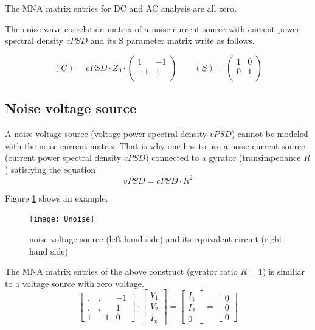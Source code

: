 The MNA matrix entries for DC and AC analysis are all zero.

\addvspace{12pt}

The noise wave correlation matrix of a noise current source with
current power spectral density $cPSD$ and its S parameter matrix
write as follows.

\begin{equation}
(\underline{C}) = cPSD\cdot Z_0\cdot
\begin{pmatrix}
   1 & -1\\
  -1 &  1\\
\end{pmatrix}
\qquad
(\underline{S}) =
\begin{pmatrix}
   1 &  0\\
   0 &  1\\
\end{pmatrix}
\end{equation}


\subsection{Noise voltage source}

A noise voltage source (voltage power spectral density $vPSD$) cannot
be modeled with the noise current matrix.  That is why one has to use
a noise current source (current power spectral density $cPSD$)
connected to a gyrator (transimpedance $R$) satisfying the equation
\begin{equation}
vPSD = cPSD \cdot R^2
\end{equation}

Figure \ref{fig:Unoise} shows an example.
\begin{figure}[ht]
\begin{center}
\texttt{[image: Unoise]}
\end{center}
\caption{noise voltage source (left-hand side) and its equivalent circuit (right-hand side)}
\label{fig:Unoise}
\end{figure}
\FloatBarrier

The MNA matrix entries of the above construct (gyrator ratio $R=1$) is
similiar to a voltage source with zero voltage.
\begin{equation}
\begin{bmatrix}
.&.& -1\\
.&.& 1\\
1 & -1 & 0
\end{bmatrix}
\cdot
\begin{bmatrix}
V_{1}\\
V_{2}\\
I_x
\end{bmatrix}
=
\begin{bmatrix}
I_{1}\\
I_{2}\\
0
\end{bmatrix}
=
\begin{bmatrix}
0\\
0\\
0
\end{bmatrix}
\end{equation}

